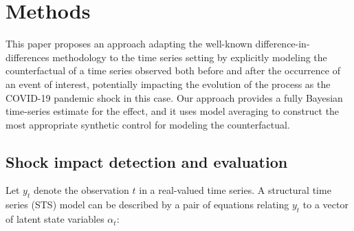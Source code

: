\documentclass[]{risa}
\begin{document}


\section{Methods}\label{methods}
This paper proposes an approach adapting the well-known difference-in-differences methodology to the time series setting by explicitly modeling the counterfactual of a time series observed both before and after the occurrence of an event of interest, potentially impacting the evolution of the process as the COVID-19 pandemic shock in this case. Our approach provides a fully Bayesian time-series estimate for the effect, and it uses model averaging to construct the most appropriate synthetic control for modeling the counterfactual. 

\subsection{Shock impact detection and evaluation}\label{methodsBSTS}
Let $y_t$ denote the observation $t$ in a real-valued time series. A structural time series (STS) model can be described by a pair of equations relating $y_t$ to a vector of latent state variables $\alpha_t$:
\end{document}
